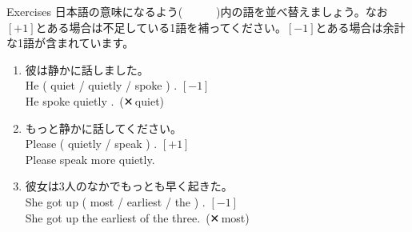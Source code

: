 \documentclass[aspectratio=169,xcolor={dvipsnames,table}]{beamer}
\begin{document}
\begin{frame}[plain]{Exercises}
日本語の意味になるよう(~~~~~~)内の語を並べ替えましょう。なお $[ +1 ]$とある場合は不足している1語を補ってください。$[ -1 ]$とある場合は余計な1語が含まれています。

 \begin{enumerate}
  \item 彼は静かに話しました。\\
	He ( quiet / quietly / spoke ) . $[-1]$\\
	He \textcolor{BurntOrange}{spoke quietly} .\,\,\,(✕\,quiet)
  \item もっと静かに話してください。\\
	Please ( quietly / speak ) . $[+1]$\\
	Please \textcolor{BurntOrange}{speak more quietly}.
  \item 彼女は3人のなかでもっとも早く起きた。\\
	She got up ( most / earliest / the ) . $[-1]$\\
	She got up \textcolor{BurntOrange}{the earliest} of the three.\,\,\,(✕\,most)

 \end{enumerate}
\end{frame}
\end{document}

